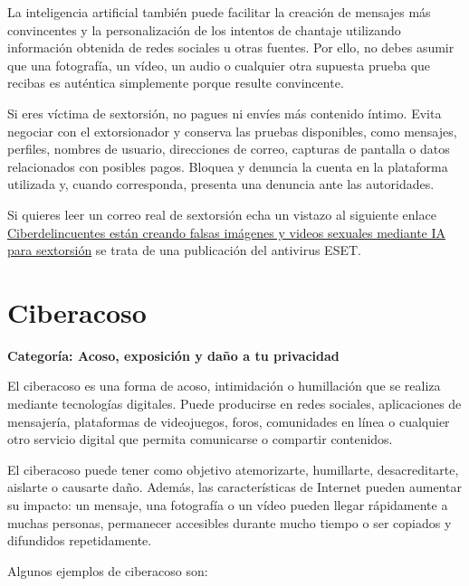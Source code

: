 \documentclass[
  spanish,
  a4paper,
  openany]{book}
\begin{document}
La inteligencia artificial también puede facilitar la creación de mensajes más convincentes y la personalización de los intentos de chantaje utilizando información obtenida de redes sociales u otras fuentes. Por ello, no debes asumir que una fotografía, un vídeo, un audio o cualquier otra supuesta prueba que recibas es auténtica simplemente porque resulte convincente.

Si eres víctima de sextorsión, no pagues ni envíes más contenido íntimo. Evita negociar con el extorsionador y conserva las pruebas disponibles, como mensajes, perfiles, nombres de usuario, direcciones de correo, capturas de pantalla o datos relacionados con posibles pagos. Bloquea y denuncia la cuenta en la plataforma utilizada y, cuando corresponda, presenta una denuncia ante las autoridades.

Si quieres leer un correo real de sextorsión echa un vistazo al siguiente enlace \href{https://www.welivesecurity.com/la-es/2023/06/09/ciberdelincuentes-falsas-imagenes-videos-sexuales-mediante-inteligencia-artificial-sextorsion/}{Ciberdelincuentes están creando falsas imágenes y videos sexuales mediante IA para sextorsión} se trata de una publicación del antivirus ESET.

\section{Ciberacoso}\label{ciberacoso}

\textbf{Categoría: Acoso, exposición y daño a tu privacidad}

El ciberacoso es una forma de acoso, intimidación o humillación que se realiza mediante tecnologías digitales. Puede producirse en redes sociales, aplicaciones de mensajería, plataformas de videojuegos, foros, comunidades en línea o cualquier otro servicio digital que permita comunicarse o compartir contenidos.

El ciberacoso puede tener como objetivo atemorizarte, humillarte, desacreditarte, aislarte o causarte daño. Además, las características de Internet pueden aumentar su impacto: un mensaje, una fotografía o un vídeo pueden llegar rápidamente a muchas personas, permanecer accesibles durante mucho tiempo o ser copiados y difundidos repetidamente.

Algunos ejemplos de ciberacoso son:
\end{document}
